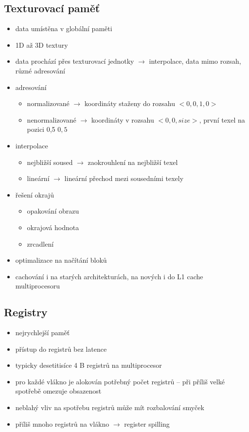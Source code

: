 	\subsection*{Texturovací paměť}
		\begin{itemize}
			\setlength\itemsep{0em}
			\item data umístěna v globální paměti
			\item 1D až 3D textury
			\item data prochází přes texturovací jednotky $\rightarrow$ interpolace, data mimo rozsah, různé adresování
			\item adresování
			\begin{itemize}
				\setlength\itemsep{0em}
				\item normalizované $\rightarrow$ koordináty staženy do rozsahu $<0{,}0, 1{,}0>$
				\item nenormalizované $\rightarrow$ koordináty v rozsahu $<0{,}0, size>$, první texel na pozici 0,5 $0{,}5$
			\end{itemize}
			\item interpolace
			\begin{itemize}
				\setlength\itemsep{0em}
				\item nejbližší soused $\rightarrow$ zaokrouhlení na nejbližší texel
				\item lineární $\rightarrow$ lineární přechod mezi sousedními texely
			\end{itemize}
			\item řešení okrajů
			\begin{itemize}
				\setlength\itemsep{0em}
				\item opakování obrazu
				\item okrajová hodnota
				\item zrcadlení
			\end{itemize}
			\item optimalizace na načítání bloků
			\item cachování i na starých architekturách, na nových i do L1 cache multiprocesoru
	\end{itemize}

	
	\subsection*{Registry}
	\begin{itemize}
		\setlength\itemsep{0em}
		\item nejrychlejší paměť
		\item přístup do registrů bez latence
		\item typicky desetitisíce 4 B registrů na multiprocesor
		\item pro každé vlákno je alokován potřebný počet registrů -- při příliš velké spotřebě omezuje obsazenost
		\item neblahý vliv na spotřebu registrů může mít rozbalování smyček
		\item příliš mnoho registrů na vlákno $\rightarrow$ register spilling
	\end{itemize}


